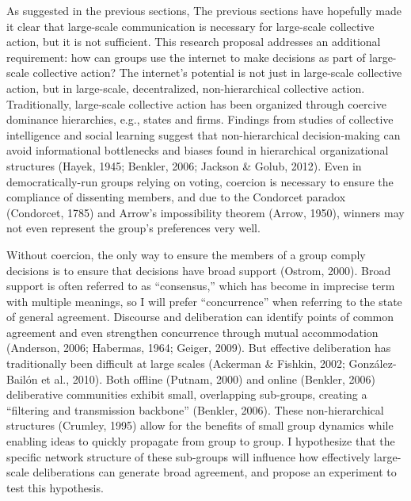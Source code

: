 As suggested in the previous sections, The previous sections have hopefully made it clear that large-scale communication is necessary for large-scale collective action, but it is not sufficient. This research proposal addresses an additional requirement: how can groups use the internet to make decisions as part of large-scale collective action? The internet’s potential is not just in large-scale collective action, but in large-scale, decentralized, non-hierarchical collective action. Traditionally, large-scale collective action has been organized through coercive dominance hierarchies, e.g., states and firms. Findings from studies of collective intelligence and social learning suggest that non-hierarchical decision-making can avoid informational bottlenecks and biases found in hierarchical organizational structures (Hayek, 1945; Benkler, 2006; Jackson \& Golub, 2012). Even in democratically-run groups relying on voting, coercion is necessary to ensure the compliance of dissenting members, and due to the Condorcet paradox (Condorcet, 1785) and Arrow’s impossibility theorem (Arrow, 1950), winners may not even represent the group’s preferences very well.

Without coercion, the only way to ensure the members of a group comply decisions is to ensure that decisions have broad support (Ostrom, 2000). Broad support is often referred to as “consensus,” which has become in imprecise term with multiple meanings, so I will prefer “concurrence” when referring to the state of general agreement. Discourse and deliberation can identify points of common agreement and even strengthen concurrence through mutual accommodation (Anderson, 2006; Habermas, 1964; Geiger, 2009). But effective deliberation has traditionally been difficult at large scales (Ackerman \& Fishkin, 2002; Gonz\'alez-Bail\'on et al., 2010). Both offline (Putnam, 2000) and online (Benkler, 2006) deliberative communities exhibit small, overlapping sub-groups, creating a “filtering and transmission backbone” (Benkler, 2006). These non-hierarchical structures (Crumley, 1995) allow for the benefits of small group dynamics while enabling ideas to quickly propagate from group to group. I hypothesize that the specific network structure of these sub-groups will influence how effectively large-scale deliberations can generate broad agreement, and propose an experiment to test this hypothesis.

